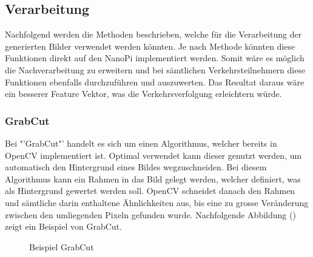 \subsection{Verarbeitung}
Nachfolgend werden die Methoden beschrieben, welche für die Verarbeitung der generierten Bilder verwendet werden könnten. Je nach Methode könnten diese Funktionen direkt auf den NanoPi implementiert werden. Somit wäre es möglich die Nachverarbeitung zu erweitern und bei sämtlichen Verkehrsteilnehmern diese Funktionen ebenfalls durchzuführen und auszuwerten. Das Resultat daraus wäre ein besserer Feature Vektor, was die Verkehrsverfolgung erleichtern würde.

\subsubsection{GrabCut}
Bei "'GrabCut"' handelt es sich um einen Algorithmus, welcher bereits in OpenCV implementiert ist. Optimal verwendet kann dieser genutzt werden, um automatisch den Hintergrund eines Bildes wegzuschneiden. Bei diesem Algorithmus kann ein Rahmen in das Bild gelegt werden, welcher definiert, was als Hintergrund gewertet werden soll. OpenCV schneidet danach den Rahmen und sämtliche darin enthaltene Ähnlichkeiten aus, bis eine zu grosse Veränderung zwischen den umliegenden Pixeln gefunden wurde. Nachfolgende Abbildung () zeigt ein Beispiel von GrabCut. 

\begin{figure}[H]
  \centering
  \caption{Beispiel GrabCut}
  \label{bGrabCut}
\end{figure}

